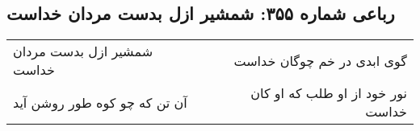 \begin{center}
\section*{رباعی شماره ۳۵۵: شمشیر ازل بدست مردان خداست}
\label{sec:0355}
\begin{longtable}{l p{0.5cm} r}
شمشیر ازل بدست مردان خداست
&&
گوی ابدی در خم چوگان خداست
\\
آن تن که چو کوه طور روشن آید
&&
نور خود از او طلب که او کان خداست
\\
\end{longtable}
\end{center}
